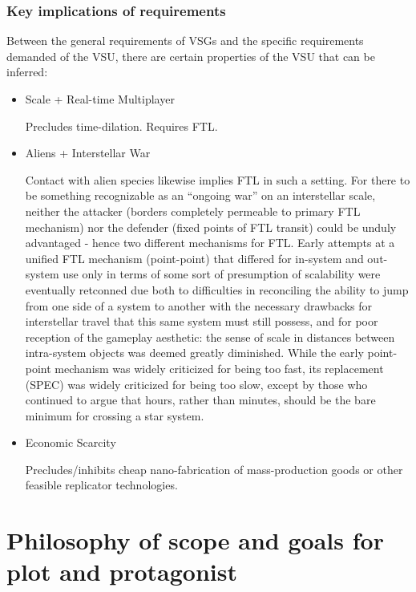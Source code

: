 \subsubsection{Key implications of requirements}

Between the general requirements of VSGs and the specific requirements
demanded of the VSU, there are certain properties of the VSU that can
be inferred:

\begin{itemize}

\item Scale + Real-time Multiplayer

Precludes time-dilation. Requires FTL.

\item Aliens + Interstellar War

Contact with alien species likewise implies FTL in such a setting. For there to be
something recognizable as an ``ongoing war'' on an interstellar
scale, neither the attacker (borders completely permeable to primary
FTL mechanism) nor the defender (fixed points of FTL transit) could be
unduly advantaged - hence two different mechanisms for FTL. Early
attempts at a unified FTL mechanism (point-point) that differed for
in-system and out-system use only in terms of some sort of presumption
of scalability were eventually retconned due both to difficulties in
reconciling the ability to jump from one side of a system to another
with the necessary drawbacks for interstellar travel that this same
system must still possess, and for poor reception of the gameplay aesthetic: the sense of scale in distances between intra-system objects was deemed greatly diminished. While the early point-point mechanism was
widely criticized for being too fast, its replacement (SPEC) was
widely criticized for being too slow, except by those who continued to
argue that hours, rather than minutes, should be the bare minimum for
crossing a star system.


\item Economic Scarcity

Precludes/inhibits cheap nano-fabrication of mass-production goods or
other feasible replicator technologies.

\end{itemize}

\section{Philosophy of scope and goals for plot and protagonist}
\label{sec:plottingphilosophy}

